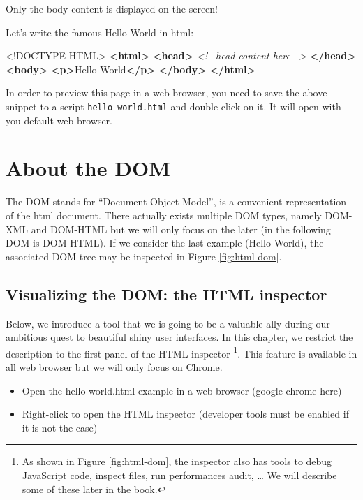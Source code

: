 \documentclass[]{book}
\newenvironment{Shaded}{\begin{snugshade}}{\end{snugshade}}
\newcommand{\CommentTok}[1]{\textcolor[rgb]{0.56,0.35,0.01}{\textit{#1}}}
\newcommand{\DataTypeTok}[1]{\textcolor[rgb]{0.13,0.29,0.53}{#1}}
\newcommand{\KeywordTok}[1]{\textcolor[rgb]{0.13,0.29,0.53}{\textbf{#1}}}
\newcommand{\NormalTok}[1]{#1}
\providecommand{\tightlist}{%
  \setlength{\itemsep}{0pt}\setlength{\parskip}{0pt}}
\begin{document}
Only the body content is displayed on the screen!

Let's write the famous Hello World in html:

\begin{Shaded}
\begin{Highlighting}[]
\DataTypeTok{<!DOCTYPE }\NormalTok{HTML}\DataTypeTok{>}
\KeywordTok{<html>}
  \KeywordTok{<head>}
  \CommentTok{<!-- head content here -->}
  \KeywordTok{</head>}
  \KeywordTok{<body>}
  \KeywordTok{<p>}\NormalTok{Hello World}\KeywordTok{</p>}
  \KeywordTok{</body>}
\KeywordTok{</html>}
\end{Highlighting}
\end{Shaded}

In order to preview this page in a web browser, you need to save the above snippet to a script \texttt{hello-world.html} and double-click on it. It will open with you default web browser.

\hypertarget{about-the-dom}{%
\section{About the DOM}\label{about-the-dom}}

The DOM stands for ``Document Object Model'', is a convenient representation of the html document. There actually exists multiple DOM types, namely DOM-XML and DOM-HTML but we will only focus on the later (in the following DOM is DOM-HTML).
If we consider the last example (Hello World), the associated DOM tree may be inspected in Figure \ref{fig:html-dom}.

\hypertarget{visualizing-the-dom-the-html-inspector}{%
\subsection{Visualizing the DOM: the HTML inspector}\label{visualizing-the-dom-the-html-inspector}}

Below, we introduce a tool that we is going to be a valuable ally during our ambitious quest to beautiful shiny user interfaces. In this chapter, we restrict the description to the first panel of the HTML inspector \footnote{As shown in Figure \ref{fig:html-dom}, the inspector also has tools to debug JavaScript code, inspect files, run performances audit, \ldots{} We will describe some of these later in the book.}. This feature is available in all web browser but we will only focus on Chrome.

\begin{itemize}
\tightlist
\item
  Open the hello-world.html example in a web browser (google chrome here)
\item
  Right-click to open the HTML inspector (developer tools must be enabled if it is not the case)
\end{itemize}
\end{document}
